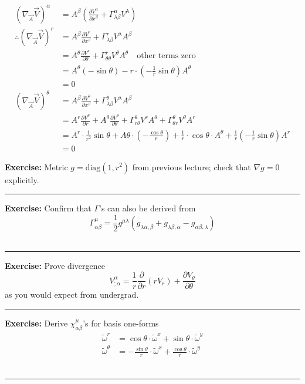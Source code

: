 \documentclass[a4paper]{article} %
\newcommand{\exercise}[2]
{
\begin{framed}
\textbf{Exercise:} #1 \\\hrule
#2
\end{framed}
}
\renewcommand{\tilde}{\widetilde}
\begin{document}
\begin{align*}
\left(\nabla_{\vec{A}}\vec{V}\right)^{\alpha}&=A^{\beta}\left(\frac{\partial V^{\alpha}}{\partial x^{\beta}}+\Gamma^{\alpha}_{\lambda\beta}V^{\lambda}\right)\\
\therefore \left(\nabla_{\vec{A}}\vec{V}\right)^{r}&=A^{\beta}\frac{\partial V^{r}}{\partial x^{\beta}}+\Gamma^r_{\lambda\beta}V^{\lambda}A^{\beta}\\
&=A^{\theta}\frac{\partial V^r}{\partial \theta}+\Gamma^{r}_{\theta\theta}V^{\theta}A^{\theta}\quad\text{other terms zero}\\
&=A^{\theta}(-\sin\theta)-r\cdot\left(-\frac{1}{r}\sin\theta\right)A^{\theta}\\
&=0\\
\left(\nabla_{\vec{A}}\vec{V}\right)^{\theta}&=A^{\beta}\frac{\partial V^{\theta}}{\partial x^{\beta}}+\Gamma^{\theta}_{\lambda\beta}V^{\lambda}A^{\beta}\\
&=A^r\frac{\partial V^{\theta}}{\partial r}+A^{\theta}\frac{\partial V^{\theta}}{\partial \theta}+\Gamma^{\theta}_{r\theta}V^{r}A^{\theta}+\Gamma^{\theta}_{\theta r}V^{\theta}A^{r}\\
&=A^{r}\cdot\frac{1}{r^2}\sin\theta+A{\theta}\cdot\left(-\frac{\cos\theta}{r}\right)+\frac{1}{r}\cdot\cos\theta\cdot A^{\theta}+\frac{1}{r}\left(-\frac{1}{r}\sin\theta\right)A^r\\
&=0
\end{align*}

\exercise{Metric $g=\text{diag}(1,r^2)$ from previous lecture; check that $\nabla g=0$ explicitly.}{}

\exercise{Confirm that $\Gamma$'s can also be derived from
\begin{equation}
\Gamma^{\mu}_{\alpha\beta}=\frac{1}{2}g^{\mu\lambda}(g_{\lambda\alpha,\beta}+g_{\lambda\beta,\alpha}
-g_{\alpha\beta,\lambda})
\end{equation}}{}

\exercise{Prove divergence
\begin{equation}
V^{\alpha}_{;\alpha}=\frac{1}{r}\frac{\partial}{\partial r}(rV_r)+\frac{\partial V_{\theta}}{\partial \theta}
\end{equation}
as you would expect from undergrad.}{}

\exercise{Derive $\chi^{\mu}_{\alpha\beta}$'s for basis one-forms
\begin{align}
\tilde{\omega}^r&=\cos\theta\cdot\tilde{\omega}^x+\sin\theta\cdot\tilde{\omega}^y\\
\tilde{\omega}^{\theta}&=-\frac{\sin\theta}{r}\cdot\tilde{\omega}^x+\frac{\cos\theta}{r}\cdot\tilde{\omega}^y
\end{align}}{}
\end{document}
